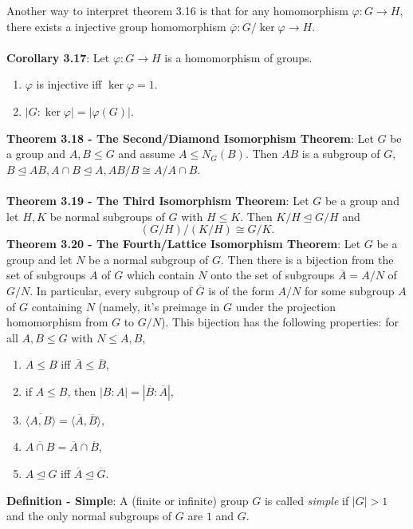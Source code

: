 \documentclass{article}
\begin{document}
Another way to interpret theorem 3.16 is that for any homomorphism $\varphi: G \rightarrow H$, there exists a injective group homomorphism $\overline{\varphi}: G/\ker{\varphi} \rightarrow H$. \\ \\
\textbf{Corollary 3.17}: Let $\varphi : G \rightarrow H$ is a homomorphism of groups. \begin{enumerate}
    \item $\varphi$ is injective iff $\ker{\varphi} = 1$.
    \item $|G : \ker{\varphi}| = |\varphi(G)|$.
\end{enumerate} $ $ \\
\textbf{Theorem 3.18 - The Second/Diamond Isomorphism Theorem}: Let $G$ be a group and $A, B \leq G$ and assume $A \leq N_G(B)$. Then $AB$ is a subgroup of $G$, $B \trianglelefteq AB, A \cap B \trianglelefteq A, AB/B \cong A/A \cap B$. \\ \\
\textbf{Theorem 3.19 - The Third Isomorphism Theorem}: Let $G$ be a group and let $H, K$ be normal subgroups of $G$ with $H \leq K$. Then $K/H \trianglelefteq G/H$ and $$(G/H)/(K/H) \cong G/K.$$
\textbf{Theorem 3.20 - The Fourth/Lattice Isomorphism Theorem}: Let $G$ be a group and let $N$ be a normal subgroup of $G$. Then there is a bijection from the set of subgroups $A$ of $G$ which contain $N$ onto the set of subgroups $\overline{A} = A/N$ of $G/N$. In particular, every subgroup of $\overline{G}$ is of the form $A/N$ for some subgroup $A$ of $G$ containing $N$ (namely, it's preimage in $G$ under the projection homomorphism from $G$ to $G/N$). This bijection has the following properties: for all $A, B \leq G$ with $N \leq A, B$, \begin{enumerate}
    \item $A \leq B$ iff $\overline{A} \leq \overline{B}$,
    \item if $A \leq B$, then $|B : A| = |\overline{B} : \overline{A}|$,
    \item $\overline{\langle A, B \rangle} = \langle \overline{A}, \overline{B} \rangle$,
    \item $\overline{A \cap B} = \overline{A} \cap \overline{B}$,
    \item $A \trianglelefteq G$ iff $\overline{A} \trianglelefteq \overline{G}$.
\end{enumerate} $ $ \\
\textbf{Definition - Simple}: A (finite or infinite) group $G$ is called \textit{simple} if $|G| > 1$ and the only normal subgroups of $G$ are $1$ and $G$. \\ \\
\end{document}
